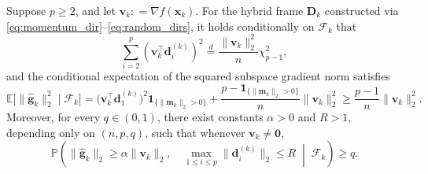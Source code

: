 \documentclass[smallextended]{svjour3}
\newcommand{\bx}{\bm{x}}
\newcommand{\bd}{\bm{d}}
\newcommand{\bg}{\bm{g}}
\providecommand{\coloneqq}{\mathrel{\mathop:}=}
\begin{document}
\begin{lemma}
\label{lem:gaussian_capture}
\label{lem:capture}
Suppose $p\ge 2$, and let $\bm v_k \coloneqq \nabla f(\bx_k)$. For the hybrid frame $\bm D_k$ constructed via \eqref{eq:momentum_dir}--\eqref{eq:random_dirs}, it holds conditionally on $\mathcal F_k$ that
\begin{equation}
\label{eq:chi_square_capture}
\sum_{i=2}^p \left( \bm v_k^\top\bd_i^{(k)} \right)^2 \overset{d}{=} \frac{\|\bm v_k\|_2^2}{n} \chi^2_{p-1},
\end{equation}
and the conditional expectation of the squared subspace gradient norm satisfies
\begin{equation}
\label{eq:expected_gaussian_capture}
\mathbb E \bigl[ \|\hat{\bg}_k\|_2^2 \;\big|\; \mathcal F_k \bigr] = \bigl(\bm v_k^\top \bd_1^{(k)}\bigr)^2 \mathbf{1}_{\{\|\bm m_k\|_2 > 0\}} + \frac{p - \mathbf{1}_{\{\|\bm m_k\|_2 > 0\}}}{n} \|\bm v_k\|_2^2 \ge \frac{p-1}{n} \|\bm v_k\|_2^2.
\end{equation}
Moreover, for every $q\in(0,1)$, there exist constants $\alpha>0$ and $R>1$, depending only on $(n, p, q)$, such that whenever $\bm v_k\ne\bm 0$,
\begin{equation}
\label{eq:good_frame_probability}
\mathbb P \left( \|\hat{\bg}_k\|_2 \ge \alpha\|\bm v_k\|_2, \quad \max_{1\le i\le p} \|\bd_i^{(k)}\|_2 \le R \;\middle|\; \mathcal F_k \right) \ge q.
\end{equation}
\end{lemma}
\end{document}
